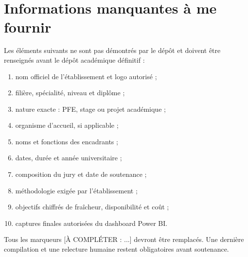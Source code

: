 \clearpage
\chapter*{Informations manquantes à me fournir}
Les éléments suivants ne sont pas démontrés par le dépôt et doivent être renseignés avant le dépôt académique définitif :

\begin{enumerate}[leftmargin=1.1cm]
  \item nom officiel de l'établissement et logo autorisé ;
  \item filière, spécialité, niveau et diplôme ;
  \item nature exacte : PFE, stage ou projet académique ;
  \item organisme d'accueil, si applicable ;
  \item noms et fonctions des encadrants ;
  \item dates, durée et année universitaire ;
  \item composition du jury et date de soutenance ;
  \item méthodologie exigée par l'établissement ;
  \item objectifs chiffrés de fraîcheur, disponibilité et coût ;
  \item captures finales autorisées du dashboard Power BI.
\end{enumerate}

Tous les marqueurs \textcolor{codepurple}{[À COMPLÉTER : ...]} devront être remplacés. Une dernière compilation et une relecture humaine restent obligatoires avant soutenance.

